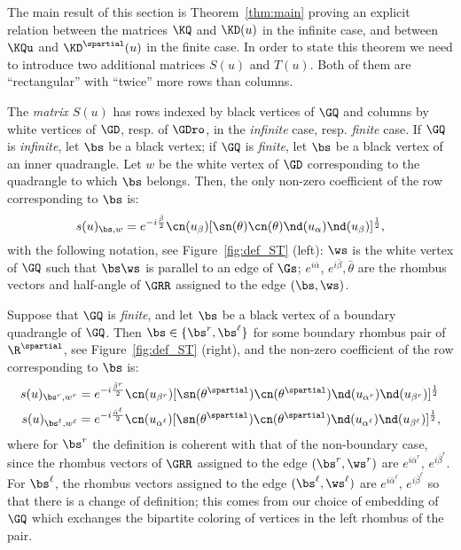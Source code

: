 \documentclass[a4paper,twoside,11pt]{article}
\begin{document}
The main result of this section is Theorem~\ref{thm:main}
proving an explicit relation between the matrices $\KQ$ and $\KD(u)$ in the infinite case, and between $\KQu$ and $\KD^\spartial(u)$
in the finite case. In order to state this theorem we need to introduce two additional matrices $S(u)$ and $T(u)$.
Both of them are ``rectangular'' with ``twice'' more rows than columns. 

The \emph{matrix $S(u)$} has rows indexed by black vertices of $\GQ$ and columns by white vertices of $\GD$, resp. of $\GDro$,
in the \emph{infinite} case, resp. \emph{finite} case. If $\GQ$ is \emph{infinite}, let 
$\bs$ be a black vertex; if $\GQ$ is \emph{finite},
let $\bs$ be a black vertex of an inner quadrangle. 
Let $w$ be the 
white vertex of $\GD$ corresponding to the quadrangle 
to which $\bs$ belongs. Then, the only non-zero coefficient of the row corresponding to $\bs$ is:
\begin{equation}\label{def:sbw}
s(u)_{\bs,w}=e^{-i\frac{\bar{\beta}}{2}}\cn(u_\beta)[\sn(\theta)\cn(\theta)\nd(u_\alpha)\nd(u_\beta)]^{\frac{1}{2}},
\end{equation}
with the following notation, see Figure~\ref{fig:def_ST} (left): $\ws$ is the white vertex of $\GQ$ such that 
$\bs\ws$ is parallel to an edge of $\Gs$; $e^{i\bar{\alpha}}$, $e^{i\bar{\beta}},\bar{\theta}$ are the rhombus vectors and half-angle
of $\GRR$ assigned to the edge $(\bs,\ws)$.

Suppose that $\GQ$ is \emph{finite}, and let $\bs$ be a black vertex of a boundary quadrangle of $\GQ$. 
Then $\bs\in\{\bs^r,\bs^\ell\}$ for some boundary rhombus pair of $\R^\spartial$,
see Figure~\ref{fig:def_ST} (right), and the non-zero coefficient of the row corresponding to $\bs$ is:
\begin{align}\label{def:sbl_boundary}
\begin{split}
s(u)_{\bs^r,w^r}&=e^{-i\frac{\bar{\beta}^r}{2}}\cn(u_{\beta^r})[\sn(\theta^\spartial)\cn(\theta^\spartial)\nd(u_{\alpha^r})\nd(u_{\beta^r})]^{\frac{1}{2}}\\
s(u)_{\bs^\ell,w^\ell}&=e^{-i\frac{\bar{\alpha}^\ell}{2}}\cn(u_{\alpha^\ell})[\sn(\theta^\spartial)\cn(\theta^\spartial)
\nd(u_{\alpha^\ell})\nd(u_{\beta^\ell})]^{\frac{1}{2}},
\end{split}
\end{align}
where for $\bs^r$ the definition is coherent with that of the non-boundary case, since the rhombus vectors of $\GRR$ assigned to the edge
$(\bs^r,\ws^r)$ are $e^{i\bar{\alpha}^r},\,e^{i\bar{\beta}^r}$. For $\bs^\ell$, the rhombus vectors assigned to the edge
$(\bs^\ell,\ws^\ell)$ are $e^{i\bar{\alpha}^\ell},\,e^{i\bar{\beta}^\ell}$ so that there is a change of definition; 
this comes from our choice of embedding of $\GQ$ which exchanges the bipartite coloring of vertices in the left rhombus of the pair.
\end{document}
